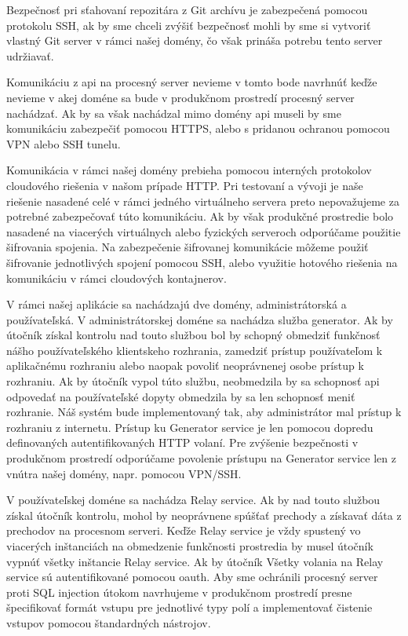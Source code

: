 Bezpečnosť pri sťahovaní repozitára z Git archívu je zabezpečená pomocou protokolu SSH, ak by sme chceli zvýšiť bezpečnosť mohli by sme si vytvoriť vlastný Git server v rámci našej domény, čo však prináša potrebu tento server udržiavať.

Komunikáciu z \acrshort{api} na procesný server nevieme v tomto bode navrhnúť keďže nevieme v akej doméne sa bude v produkčnom prostredí procesný server nachádzať. Ak by sa však nachádzal mimo domény \acrshort{api} museli by sme komunikáciu zabezpečiť pomocou HTTPS, alebo s pridanou ochranou pomocou VPN alebo SSH tunelu.

Komunikácia v rámci našej domény prebieha pomocou interných protokolov cloudového riešenia v našom prípade HTTP.  Pri testovaní a vývoji je naše riešenie nasadené celé v rámci jedného virtuálneho servera preto nepovažujeme za potrebné zabezpečovať túto komunikáciu. Ak by však produkčné prostredie bolo nasadené na viacerých virtuálnych alebo fyzických serveroch odporúčame použitie šifrovania spojenia. Na zabezpečenie šifrovanej komunikácie môžeme použiť šifrovanie jednotlivých spojení pomocou SSH, alebo využitie hotového riešenia na komunikáciu v rámci cloudových kontajnerov.

V rámci našej aplikácie sa nachádzajú dve domény, administrátorská a používateľská. V administrátorskej doméne sa nachádza služba generator. Ak by útočník získal kontrolu nad touto službou bol by schopný obmedziť funkčnosť nášho používateľského klientskeho rozhrania, zamedziť prístup používateľom k aplikačnému rozhraniu alebo naopak povoliť neoprávnenej osobe prístup k rozhraniu. Ak by útočník vypol túto službu, neobmedzila by  sa schopnosť \acrshort{api} odpovedať na používateľské dopyty obmedzila  by sa len schopnosť meniť rozhranie. Náš systém bude implementovaný tak, aby administrátor mal prístup k rozhraniu z internetu. Prístup ku Generator service je len pomocou dopredu definovaných autentifikovaných HTTP volaní. Pre zvýšenie bezpečnosti v produkčnom prostredí odporúčame povolenie prístupu na Generator service len z vnútra našej domény, napr. pomocou VPN/SSH.

V používateľskej doméne sa nachádza Relay service. Ak by nad touto službou získal útočník kontrolu, mohol by neoprávnene spúšťať prechody a získavať dáta z prechodov na procesnom serveri. Keďže Relay service je vždy spustený vo viacerých inštanciách na obmedzenie funkčnosti prostredia by musel útočník vypnúť všetky inštancie Relay service. Ak by útočník Všetky volania na Relay service sú autentifikované pomocou \acrshort{oauth}.  Aby sme ochránili procesný server proti SQL injection útokom navrhujeme v produkčnom prostredí presne špecifikovať formát vstupu pre jednotlivé typy polí a  implementovať čistenie vstupov pomocou štandardných nástrojov.

